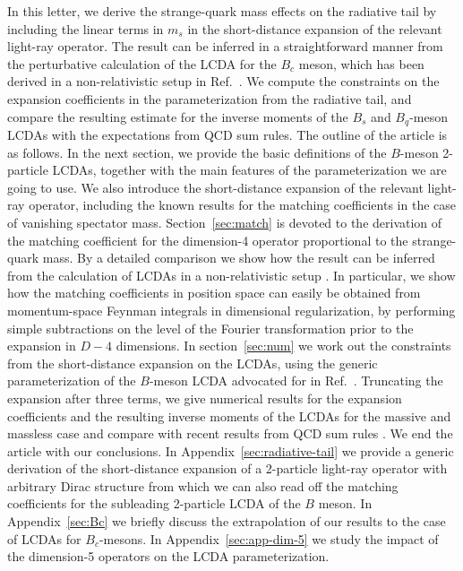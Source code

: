 \documentclass[a4paper,11pt]{article}
\begin{document}
In this letter, we derive the strange-quark mass effects on the radiative tail by including the linear terms in $m_s$ in the short-distance expansion of the relevant light-ray operator. The result can be inferred in a straightforward manner from the perturbative calculation of the LCDA for the $B_c$ meson, which has been derived in a non-relativistic setup in Ref.~\cite{Bell:2008er}.
%
We compute the constraints on the expansion coefficients in the parameterization \cite{Feldmann:2022uok} from the radiative tail, and compare the resulting estimate for the inverse moments of the $B_s$ and $B_q$-meson LCDAs with the expectations from QCD sum rules. 
%
%
The outline of the article is as follows. In the next section, we provide the basic definitions of the $B$-meson 2-particle LCDAs, together 
with the main features of the parameterization we are going to use. We also introduce the short-distance expansion of the relevant light-ray operator, 
including the known results for the matching coefficients in the case of vanishing spectator mass.
%
Section~\ref{sec:match} is devoted to the derivation of the matching coefficient for the dimension-4 operator proportional to the strange-quark mass.
By a detailed comparison we show how the result can be inferred from the calculation of LCDAs in a non-relativistic setup \cite{Bell:2008er}.
In particular, we show how the matching coefficients in position space can easily be obtained from momentum-space Feynman integrals
in dimensional regularization, 
by performing simple subtractions on the level of the Fourier transformation prior to the expansion in $D-4$ dimensions.
%
In section~\ref{sec:num} we work out the constraints from the short-distance expansion on the LCDAs, using the generic parameterization
of the $B$-meson LCDA advocated for in Ref.~\cite{Feldmann:2022uok}. 
Truncating the expansion after three terms, 
we give numerical results for the expansion coefficients and the resulting inverse moments of the LCDAs 
for the massive and massless case and compare with recent results from QCD sum rules \cite{Khodjamirian:2020hob}. 
We end the article with our conclusions. In Appendix~\ref{sec:radiative-tail} we provide a generic derivation of the short-distance expansion of
a 2-particle light-ray operator with arbitrary Dirac structure from which we can also read off the matching coefficients for 
the subleading 2-particle LCDA of the $B$ meson.
In Appendix~\ref{sec:Bc} we briefly discuss the extrapolation of our results to the case of LCDAs for $B_c$-mesons. In Appendix~\ref{sec:app-dim-5} we study the impact of the 
dimension-5 operators on the LCDA parameterization.
\end{document}
